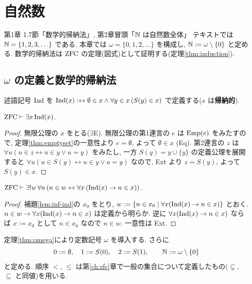 \chapter{自然数}\label{ch:naturals}

\begin{textref}{第1章 1.7節「数学的帰納法」, 第2章冒頭「$\mathbb{N}$ は自然数全体」}
  テキストでは $\mathbb{N} = \{1,2,3,\ldots\}$ である. 本章では $\omega = \{0,1,2,\ldots\}$ を構成し, $\mathbb{N} := \omega \setminus \{0\}$ と定める. 数学的帰納法は $\mathrm{ZFC}$ の定理(図式)として証明する(定理\ref{thm:induction}).
\end{textref}

\section{$\omega$ の定義と数学的帰納法}

\begin{dfn}
  述語記号 $\mathrm{Ind}$ を $\mathrm{Ind}(x) :\leftrightarrow \emptyset \in x \land \forall y \in x\,(S(y) \in x)$ で定義する($x$ は\textbf{帰納的}).
\end{dfn}

\begin{lem}\label{lem:inf-ind}
  $\mathrm{ZFC} \vdash \exists x\,\mathrm{Ind}(x)$.
\end{lem}
\begin{proof}
  無限公理の $x$ をとる($\exists$E). 無限公理の第1連言の $e$ は $\mathrm{Emp}(e)$ をみたすので, 定理\ref{thm:emptyset}の一意性より $e = \emptyset$, よって $\emptyset \in x$ (Eq). 第2連言の $z$ は $\forall u(u \in z \leftrightarrow u \in y \lor u = y)$ をみたし, 一方 $S(y) = y \cup \{y\}$ の定義公理を展開すると $\forall u(u \in S(y) \leftrightarrow u \in y \lor u = y)$ なので, Ext より $z = S(y)$, よって $S(y) \in x$.
\end{proof}

\begin{thm}\label{thm:omega}
  $\mathrm{ZFC} \vdash \exists ! w\,\forall n\,(n \in w \leftrightarrow \forall x\,(\mathrm{Ind}(x) \to n \in x))$.
\end{thm}
\begin{proof}
  補題\ref{lem:inf-ind}の $x_0$ をとり, $w := \{n \in x_0 \mid \forall x(\mathrm{Ind}(x) \to n \in x)\}$ とおく. $n \in w \to \forall x(\mathrm{Ind}(x) \to n \in x)$ は定義から明らか. 逆に $\forall x(\mathrm{Ind}(x) \to n \in x)$ ならば $x := x_0$ として $n \in x_0$ なので $n \in w$. 一意性は Ext.
\end{proof}

\begin{dfn}
  定理\ref{thm:omega}により定数記号 $\omega$ を導入する. さらに
  \[ 0 := \emptyset,\quad 1 := S(0),\quad 2 := S(1), \qquad \mathbb{N} := \omega \setminus \{0\} \]
  と定める. 順序 $<$, $\leq$ は第\ref{ch:zfc}章で一般の集合について定義したもの($\subsetneq$, $\subseteq$ と同値)を用いる.
\end{dfn}

